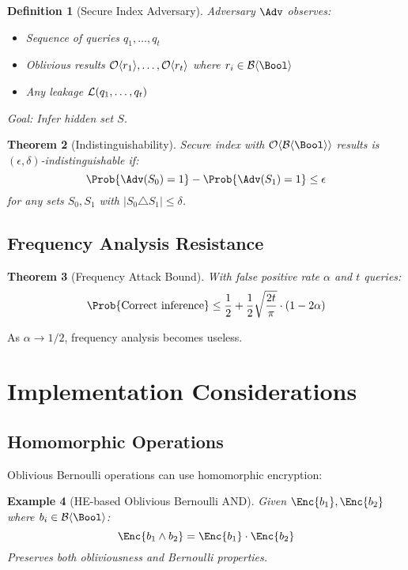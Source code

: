 \documentclass[11pt,final,hidelinks]{article}
\newcommand{\BernBool}{\mathcal{B}\langle \Bool \rangle}
\newcommand{\fprate}{\alpha}
\newtheorem{theorem}{Theorem}[section]
\newtheorem{definition}[theorem]{Definition}
\newtheorem{example}[theorem]{Example}
\begin{document}
\begin{definition}[Secure Index Adversary]
Adversary $\Adv$ observes:
\begin{itemize}
    \item Sequence of queries $q_1, \ldots, q_t$
    \item Oblivious results $\mathcal{O}\langle r_1 \rangle, \ldots, \mathcal{O}\langle r_t \rangle$ where $r_i \in \BernBool$
    \item Any leakage $\mathcal{L}(q_1, \ldots, q_t)$
\end{itemize}
Goal: Infer hidden set $S$.
\end{definition}

\begin{theorem}[Indistinguishability]
Secure index with $\Obv{\BernBool}$ results is $(\epsilon, \delta)$-indistinguishable if:
\begin{equation}
\Prob{\Adv(S_0) = 1} - \Prob{\Adv(S_1) = 1} \leq \epsilon
\end{equation}
for any sets $S_0, S_1$ with $|S_0 \triangle S_1| \leq \delta$.
\end{theorem}

\subsection{Frequency Analysis Resistance}

\begin{theorem}[Frequency Attack Bound]
With false positive rate $\fprate$ and $t$ queries:
\begin{equation}
\Prob{\text{Correct inference}} \leq \frac{1}{2} + \frac{1}{2}\sqrt{\frac{2t}{\pi}} \cdot (1 - 2\fprate)
\end{equation}
\end{theorem}

As $\fprate \to 1/2$, frequency analysis becomes useless.

\section{Implementation Considerations}

\subsection{Homomorphic Operations}

Oblivious Bernoulli operations can use homomorphic encryption:

\begin{example}[HE-based Oblivious Bernoulli AND]
Given $\Enc{b_1}, \Enc{b_2}$ where $b_i \in \BernBool$:
\begin{equation}
\Enc{b_1 \land b_2} = \Enc{b_1} \cdot \Enc{b_2}
\end{equation}
Preserves both obliviousness and Bernoulli properties.
\end{example}
\end{document}
